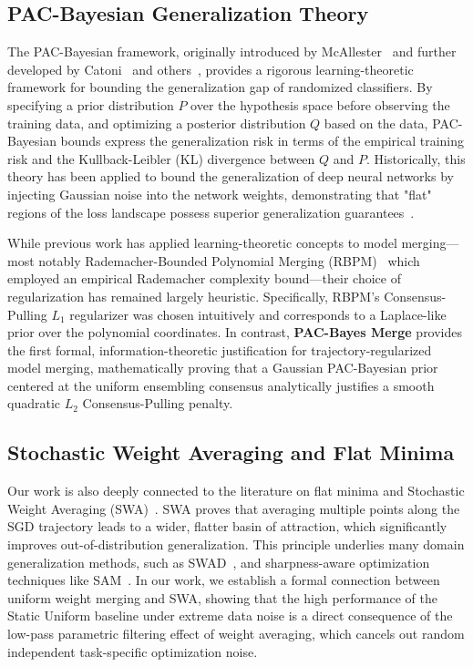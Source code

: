 \subsection{PAC-Bayesian Generalization Theory}
The PAC-Bayesian framework, originally introduced by McAllester~\cite{mcallester1999pac} and further developed by Catoni~\cite{catoni2007pac} and others~\cite{langford2001pac, alquier2021user}, provides a rigorous learning-theoretic framework for bounding the generalization gap of randomized classifiers. By specifying a prior distribution $P$ over the hypothesis space before observing the training data, and optimizing a posterior distribution $Q$ based on the data, PAC-Bayesian bounds express the generalization risk in terms of the empirical training risk and the Kullback-Leibler (KL) divergence between $Q$ and $P$. Historically, this theory has been applied to bound the generalization of deep neural networks by injecting Gaussian noise into the network weights, demonstrating that "flat" regions of the loss landscape possess superior generalization guarantees~\cite{dziugaite2017computing, neyshabur2017exploring, guedj2019primer}.

While previous work has applied learning-theoretic concepts to model merging---most notably Rademacher-Bounded Polynomial Merging (RBPM)~\cite{trial5_submission2} which employed an empirical Rademacher complexity bound---their choice of regularization has remained largely heuristic. Specifically, RBPM's Consensus-Pulling $L_1$ regularizer was chosen intuitively and corresponds to a Laplace-like prior over the polynomial coordinates. In contrast, \textbf{PAC-Bayes Merge} provides the first formal, information-theoretic justification for trajectory-regularized model merging, mathematically proving that a Gaussian PAC-Bayesian prior centered at the uniform ensembling consensus analytically justifies a smooth quadratic $L_2$ Consensus-Pulling penalty.

\subsection{Stochastic Weight Averaging and Flat Minima}
Our work is also deeply connected to the literature on flat minima and Stochastic Weight Averaging (SWA)~\cite{izmailov2018averaging}. SWA proves that averaging multiple points along the SGD trajectory leads to a wider, flatter basin of attraction, which significantly improves out-of-distribution generalization. This principle underlies many domain generalization methods, such as SWAD~\cite{cha2021swad}, and sharpness-aware optimization techniques like SAM~\cite{foret2021sharpness}. In our work, we establish a formal connection between uniform weight merging and SWA, showing that the high performance of the Static Uniform baseline under extreme data noise is a direct consequence of the low-pass parametric filtering effect of weight averaging, which cancels out random independent task-specific optimization noise.
